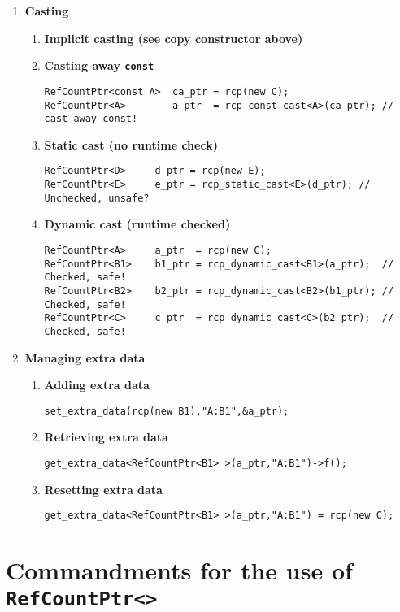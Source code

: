 \documentclass[pdf,ps2pdf,11pt]{SANDreport}
\begin{document}
\begin{enumerate}
\item {\bf Casting}
\label{rcpqs:apdx:qs:casting}
%
\begin{enumerate}
%
\item {\bf Implicit casting (see copy constructor above)}
%
\item {\bf Casting away \texttt{const}}
%
{\small\begin{verbatim}
RefCountPtr<const A>  ca_ptr = rcp(new C);
RefCountPtr<A>        a_ptr  = rcp_const_cast<A>(ca_ptr); // cast away const!
\end{verbatim}}
%
\item {\bf Static cast (no runtime check)}
%
{\small\begin{verbatim}
RefCountPtr<D>     d_ptr = rcp(new E);
RefCountPtr<E>     e_ptr = rcp_static_cast<E>(d_ptr); // Unchecked, unsafe?
\end{verbatim}}
%
\item {\bf Dynamic cast (runtime checked)}
%
{\small\begin{verbatim}
RefCountPtr<A>     a_ptr  = rcp(new C);
RefCountPtr<B1>    b1_ptr = rcp_dynamic_cast<B1>(a_ptr);  // Checked, safe!
RefCountPtr<B2>    b2_ptr = rcp_dynamic_cast<B2>(b1_ptr); // Checked, safe!
RefCountPtr<C>     c_ptr  = rcp_dynamic_cast<C>(b2_ptr);  // Checked, safe!
\end{verbatim}}
%
\end{enumerate}

\item {\bf Managing extra data}
\label{rcpqs:apdx:qs:extra-data}
%
\begin{enumerate}
%
\item {\bf Adding extra data}
%
{\small\begin{verbatim}
set_extra_data(rcp(new B1),"A:B1",&a_ptr);
\end{verbatim}}
%
\item {\bf Retrieving extra data}
%
{\small\begin{verbatim}
get_extra_data<RefCountPtr<B1> >(a_ptr,"A:B1")->f();
\end{verbatim}}
%
\item {\bf Resetting extra data}
%
{\small\begin{verbatim}
get_extra_data<RefCountPtr<B1> >(a_ptr,"A:B1") = rcp(new C);
\end{verbatim}}
%
\end{enumerate}

\end{enumerate}

%
\section{Commandments for the use of {}\texttt{Ref\-Count\-Ptr<>}}
\label{rcpqs:apdx:commandments}
%
\end{document}
